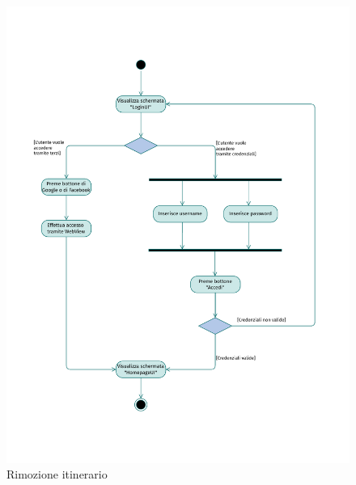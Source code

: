 \documentclass{natourDoc}
\begin{document}
	\newpage
	\begin{figure}[!htbp]
		\centering
		\includegraphics[width=\textwidth, page=10]{./diagrams/activity.pdf}
		\caption{Rimozione itinerario}
	\end{figure}
	\FloatBarrier
\end{document}
